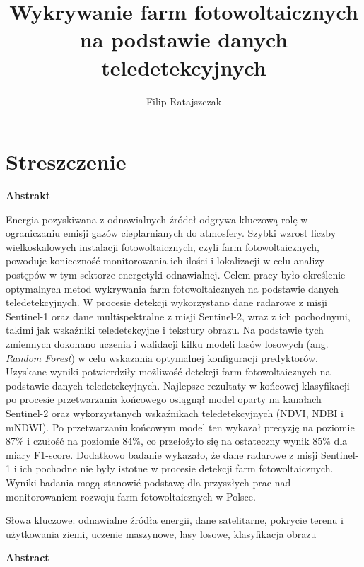 \documentclass{amuthesis}
\author{Filip Ratajszczak}
\title{Wykrywanie farm fotowoltaicznych na podstawie danych
teledetekcyjnych}
\begin{document}

\titlepage


\hypertarget{streszczenie}{%
\chapter*{Streszczenie}\label{streszczenie}}


\textbf{Abstrakt}

Energia pozyskiwana z odnawialnych źródeł odgrywa kluczową rolę w
ograniczaniu emisji gazów cieplarnianych do atmosfery. Szybki wzrost
liczby wielkoskalowych instalacji fotowoltaicznych, czyli farm
fotowoltaicznych, powoduje konieczność monitorowania ich ilości i
lokalizacji w celu analizy postępów w tym sektorze energetyki
odnawialnej. Celem pracy było określenie optymalnych metod wykrywania
farm fotowoltaicznych na podstawie danych teledetekcyjnych. W procesie
detekcji wykorzystano dane radarowe z misji Sentinel-1 oraz dane
multispektralne z misji Sentinel-2, wraz z ich pochodnymi, takimi jak
wskaźniki teledetekcyjne i tekstury obrazu. Na podstawie tych zmiennych
dokonano uczenia i walidacji kilku modeli lasów losowych (ang.
\emph{Random Forest}) w celu wskazania optymalnej konfiguracji
predyktorów. Uzyskane wyniki potwierdziły możliwość detekcji farm
fotowoltaicznych na podstawie danych teledetekcyjnych. Najlepsze
rezultaty w końcowej klasyfikacji po procesie przetwarzania końcowego
osiągnął model oparty na kanałach Sentinel-2 oraz wykorzystanych
wskaźnikach teledetekcyjnych (NDVI, NDBI i mNDWI). Po przetwarzaniu
końcowym model ten wykazał precyzję na poziomie 87\% i czułość na
poziomie 84\%, co przełożyło się na ostateczny wynik 85\% dla miary
F1-score. Dodatkowo badanie wykazało, że dane radarowe z misji
Sentinel-1 i ich pochodne nie były istotne w procesie detekcji farm
fotowoltaicznych. Wyniki badania mogą stanowić podstawę dla przyszłych
prac nad monitorowaniem rozwoju farm fotowoltaicznych w Polsce.

Słowa kluczowe: odnawialne źródła energii, dane satelitarne, pokrycie
terenu i użytkowania ziemi, uczenie maszynowe, lasy losowe, klasyfikacja
obrazu

\newpage

\textbf{Abstract}
\end{document}
